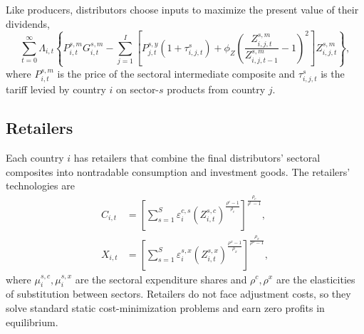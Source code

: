 \documentclass[12pt]{article}
\begin{document}
Like producers, distributors choose inputs to maximize the present value of their dividends,
\begin{equation}
    \sum_{t=0}^\infty \Lambda_{i,t} \left\{P^{s,m}_{i,t} G^{s,m}_{i,t}-\sum_{j=1}^I \left[P^{s,y}_{j,t}(1+\tau^s_{i,j,t}) + \phi_Z \left(\frac{Z^{s,m}_{i,j,t}}{Z^{s,m}_{i,j,t-1}}-1\right)^2\right]Z^{s,m}_{i,j,t}\right\},
\end{equation}
where $P^{s,m}_{i,t}$ is the price of the sectoral intermediate composite and $\tau^s_{i,j,t}$ is the tariff levied by country $i$ on sector-$s$ products from country $j$.

\subsection{Retailers}
Each country $i$ has retailers that combine the final distributors' sectoral composites into nontradable consumption and investment goods. The retailers' technologies are
\begin{align}
     C_{i,t} &= \left[\sum_{s=1}^S\varepsilon^{c,s}_{i} \left(Z^{s,c}_{i,t}\right)^{\frac{\rho^c-1}{\rho_c}}\right]^{\frac{\rho_c}{\rho^c-1}},\\
     X_{i,t} &= \left[\sum_{s=1}^S \varepsilon^{s,x}_{i} \left(Z^{s,x}_{i,t}\right)^{\frac{\rho^x-1}{\rho_x}}\right]^{\frac{\rho_x}{\rho^x-1}},
\end{align}
where $\mu^{s,c}_i,\mu^{s,x}_i$ are the sectoral expenditure shares and $\rho^c,\rho^x$ are the elasticities of substitution between sectors. Retailers do not face adjustment costs, so they solve standard static cost-minimization problems and earn zero profits in equilibrium.
\end{document}
